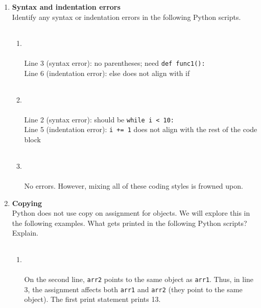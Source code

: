 \documentclass{article}
\newcounter{points}
\begin{document}
\begin{enumerate}
\newpage
\item \textbf{Syntax and indentation errors} \\
Identify any syntax or indentation errors in the following Python scripts.

\begin{enumerate}
\item
\lstset{numbers=left}
\begin{tabular}{c}

\end{tabular} \\ \\
Line 3 (syntax error): no parentheses; need \texttt{def func1():} \\
Line 6 (indentation error): else does not align with if
\end{enumerate}

\begin{enumerate}
\setcounter{enumii}{1}
\item
\lstset{numbers=left}
\begin{tabular}{c}

\end{tabular} \\ \\
Line 2 (syntax error): should be \texttt{while i < 10:} \\
Line 5 (indentation error): \texttt{i += 1} does not align with the rest of the code block
\end{enumerate}

\begin{enumerate}
\setcounter{enumii}{2}
\item
\lstset{numbers=left}
\begin{tabular}{c}

\end{tabular} \\ \\
No errors.  However, mixing all of these coding styles is frowned upon.
\end{enumerate}

\newpage
\item \textbf{Copying} \\
Python does not use copy on assignment for objects.  We will explore this in the following examples.  What gets printed in the following Python scripts?  Explain.

\begin{enumerate}
\item
\begin{tabular}{c}

\end{tabular} \\ \\
On the second line, \texttt{arr2} points to the same object as \texttt{arr1}.  Thus, in line 3, the assignment affects both \texttt{arr1} and \texttt{arr2} (they point to the same object).  The first print statement prints 13. \\


\end{enumerate}
\end{enumerate}
\end{document}

